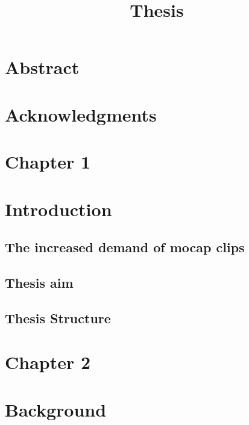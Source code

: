\documentclass[12pt,oneside,a4paper,english]{article}
\title{Thesis} %
\begin{document}

\newpage
\doublespacing

\renewcommand{\baselinestretch}{1}\normalsize

\tableofcontents
\newpage
\listoffigures

\renewcommand{\baselinestretch}{1}\normalsize
\singlespacing
\thispagestyle{fancy} %
\newpage
{} 

\newpage
\addtocounter{section}{-1}
\section{Abstract}
 
\addtocounter{section}{-1}
\newpage
\section{Acknowledgments}
 

\newpage
\section*{Chapter 1 \\}
\section{Introduction}
\subsection{The increased demand of mocap clips}
 
\subsection{Thesis aim}
 
\subsection{Thesis Structure}
 

\newpage
\section*{Chapter 2 \\}
\section{Background}
\end{document}
